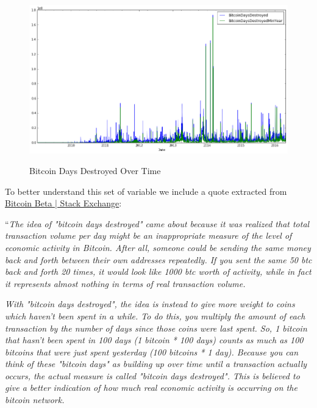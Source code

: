 \begin{figure}[bth]
  \myfloatalign
  {\includegraphics[width=1\linewidth]
    {gfx/bitcoin-days-destroyed-over-time}}
  \caption{Bitcoin Days Destroyed Over Time}
  \label{fig:bitcoin-days-destroyed-over-time}
\end{figure}

To better understand this set of variable we include a quote extracted
from
\href{http://bitcoin.stackexchange.com/questions/845/what-are-bitcoin-days-destroyed}{Bitcoin
  Beta | Stack Exchange}:

``\textit{The idea of "bitcoin days destroyed" came about because it
  was realized that total transaction volume per day might be an
  inappropriate measure of the level of economic activity in Bitcoin.
  After all, someone could be sending the same money back and forth
  between their own addresses repeatedly. If you sent the same 50 btc
  back and forth 20 times, it would look like 1000 btc worth of
  activity, while in fact it represents almost nothing in terms of
  real transaction volume.}

\textit{With "bitcoin days destroyed", the idea is instead to give
  more weight to coins which haven't been spent in a while. To do
  this, you multiply the amount of each transaction by the number of
  days since those coins were last spent. So, 1 bitcoin that hasn't
  been spent in 100 days (1 bitcoin * 100 days) counts as much as 100
  bitcoins that were just spent yesterday (100 bitcoins * 1 day).
  Because you can think of these "bitcoin days" as building up over
  time until a transaction actually occurs, the actual measure is
  called "bitcoin days destroyed". This is believed to give a better
  indication of how much real economic activity is occurring on the
  bitcoin network.}

